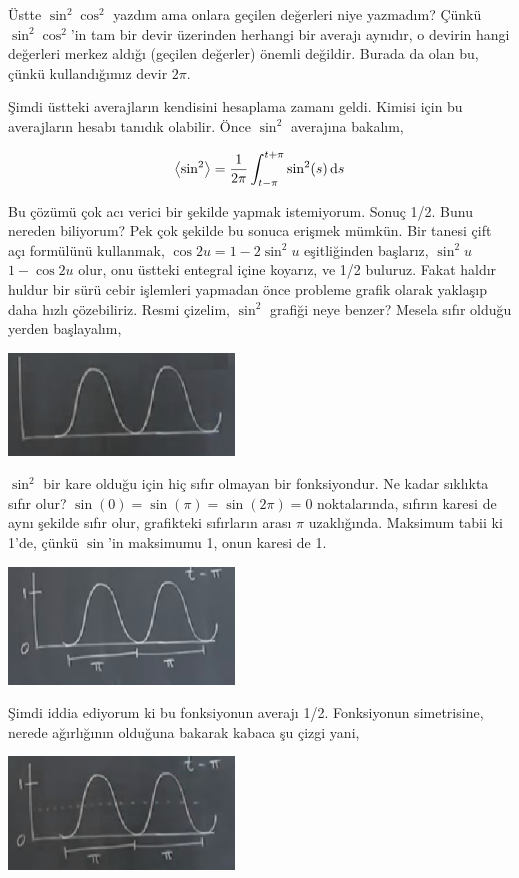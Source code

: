 \documentclass[12pt,fleqn]{article}\usepackage{../../common}
\begin{document}
Üstte $\sin^2\cos^2$ yazdım ama onlara geçilen değerleri niye yazmadım? Çünkü
$\sin^2\cos^2$'in tam bir devir üzerinden herhangi bir averajı aynıdır, o
devirin hangi değerleri merkez aldığı (geçilen değerler) önemli değildir. Burada
da olan bu, çünkü kullandığımız devir $2\pi$.

Şimdi üstteki averajların kendisini hesaplama zamanı geldi. Kimisi için bu
averajların hesabı tanıdık olabilir. Önce $\sin^2$ averajına bakalım,

$$
\bigl \langle \sin^2 \bigr\rangle  =
\frac{1}{2\pi} \int _{t-\pi}^{t+\pi} \sin^2 (s) \,\mathrm{d} s
$$

Bu çözümü çok acı verici bir şekilde yapmak istemiyorum. Sonuç 1/2. Bunu nereden
biliyorum? Pek çok şekilde bu sonuca erişmek mümkün. Bir tanesi çift açı
formülünü kullanmak, $\cos 2u = 1-2\sin^2 u$ eşitliğinden başlarız, $\sin^2 u$
$1-\cos 2u$ olur, onu üstteki entegral içine koyarız, ve 1/2 buluruz. Fakat
haldır huldur bir sürü cebir işlemleri yapmadan önce probleme grafik olarak
yaklaşıp daha hızlı çözebiliriz. Resmi çizelim, $\sin^2$ grafiği neye benzer?
Mesela sıfır olduğu yerden başlayalım,

\includegraphics[width=6cm]{11_01.png}
 
$\sin^2$ bir kare olduğu için hiç sıfır olmayan bir fonksiyondur. Ne kadar
sıklıkta sıfır olur? $\sin(0)=\sin(\pi)=\sin(2\pi)=0$ noktalarında, sıfırın
karesi de aynı şekilde sıfır olur, grafikteki sıfırların arası $\pi$
uzaklığında. Maksimum tabii ki 1'de, çünkü $\sin$'in maksimumu 1, onun karesi de
1.

\includegraphics[width=6cm]{11_02.png}
 
Şimdi iddia ediyorum ki bu fonksiyonun averajı 1/2. Fonksiyonun simetrisine,
nerede ağırlığının olduğuna bakarak kabaca şu çizgi yani,

\includegraphics[width=6cm]{11_03.png}
\end{document}
